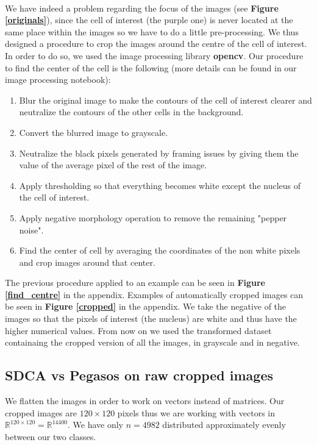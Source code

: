 \documentclass[10pt,a4paper]{article}
\begin{document}
\paragraph{}
We have indeed a problem regarding the focus of the images (see \textbf{Figure \ref{originals}}), since the cell of interest (the purple one) is never located at the same place within the images so we have to do a little pre-processing. We thus designed a procedure to crop the images around the centre of the cell of interest. In order to do so, we used the image processing library \textbf{opencv}. Our procedure to find the center of the cell is the following (more details can be found in our image processing notebook): 
\begin{enumerate}
	\item Blur the original image to make the contours of the cell of interest clearer and neutralize the contours of the other cells in the background.
	\item Convert the blurred image to grayscale.
	\item Neutralize the black pixels generated by framing issues by giving them the value of the average pixel of the rest of the image.
	\item Apply thresholding so that everything becomes white except the nucleus of the cell of interest.
	\item Apply negative morphology operation to remove the remaining "pepper noise".
	\item Find the center of cell by averaging the coordinates of the non white pixels and crop images around that center.
\end{enumerate}

The previous procedure applied to an example can be seen in \textbf{Figure  \ref{find_centre}} in the appendix. Examples of automatically cropped images can be seen in \textbf{Figure \ref{cropped}} in the appendix. We take the negative of the images so that the pixels of interest (the nucleus) are white and thus have the higher numerical values. From now on we used the transformed dataset containaing the cropped version of all the images, in grayscale and in negative.



\subsection {SDCA vs Pegasos on raw cropped images}

We flatten the images in order to work on vectors instead of matrices. Our cropped images are $120 \times 120$ pixels thus we are working with vectors in $\mathbb{R}^{120\times120} = \mathbb{R}^{14400}$. We have only $n=4982$ distributed approximately evenly between our two classes.
\end{document}
